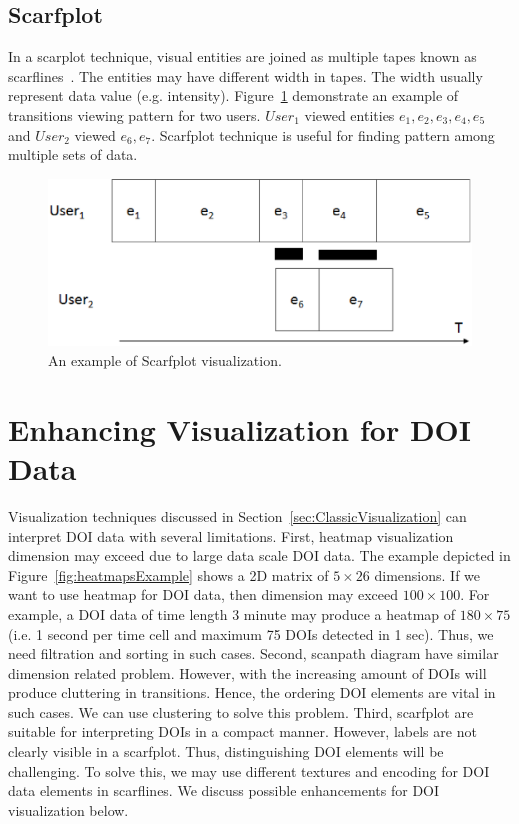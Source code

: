 \subsection{Scarfplot}
In a scarplot technique, visual entities are joined as multiple tapes known as scarflines~\cite{richardson2005looking}. The entities may have different width in tapes. The width usually represent data value (e.g. intensity). Figure~\ref{fig:scarfplotExample} demonstrate an example of transitions viewing pattern for two users. $User_1$ viewed entities $e_1, e_2, e_3, e_4,e_5$ and $User_2$ viewed $e_6, e_7$. Scarfplot technique is useful for finding pattern among multiple sets of data. 
\begin{figure}[htbp]
  \centering
  \includegraphics[width=\linewidth]{images/ScarfplotExample.eps}
  \caption{An example of Scarfplot visualization. }
	\label{fig:scarfplotExample}
\end{figure}

\section{Enhancing Visualization for DOI Data}
Visualization techniques discussed in Section~\ref{sec:ClassicVisualization} can interpret DOI data with several limitations. First, heatmap visualization dimension may exceed due to large data scale DOI data. The example depicted in Figure~\ref{fig:heatmapsExample} shows a 2D matrix of $5 \times 26$ dimensions. If we want to use heatmap for DOI data, then dimension may exceed $100 \times 100$. For example, a DOI data of time length 3 minute may produce a heatmap of $180 \times 75$ (i.e. 1 second per time cell and maximum 75 DOIs detected in 1 sec). Thus, we need filtration and sorting in such cases. Second, scanpath diagram have similar dimension related problem. However, with the increasing amount of DOIs will produce cluttering in transitions. Hence, the ordering DOI elements are vital in such cases. We can use clustering to solve this problem. Third, scarfplot are suitable for interpreting DOIs in a compact manner. However, labels are not clearly visible in a scarfplot. Thus, distinguishing DOI elements will be challenging. To solve this, we may use different textures and encoding for DOI data elements in scarflines. We discuss possible enhancements for DOI visualization below. 


